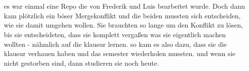 
\newcommand{\germanQuote}[1]{„\textit{#1}“}
\newcommand{\englishQuote}[1]{``\textit{#1}''}



\chapter{\chapterTwo}
es war einmal eine Repo die von Frederik und Luis bearbeitet wurde.
Doch dann kam plötzlich ein böser Mergekonflikt und die beiden mussten sich entscheiden, wie sie damit umgehen wollen.
Sie brauchten so lange um den Konflikt zu lösen, bis sie entscheideten, dass sie komplett vergaßen was sie eigentlich machen wollten - nähmlich auf die klausur lernen.
so kam es also dazu, dass sie die klausur verhauen haben und das semester wiederholen mussten.
und wenn sie nicht gestorben sind, dann studieren sie noch heute.

